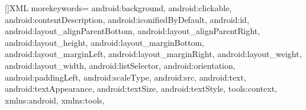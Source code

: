 
[]{XML} {
	morekeywords={
		android:background,
		android:clickable,
		android:contentDescription,
		android:iconifiedByDefault,
		android:id,
		android:layout_alignParentBottom,
		android:layout_alignParentRight,
		android:layout_height,
		android:layout_marginBottom,
		android:layout_marginLeft,
		android:layout_marginRight,
		android:layout_weight,
		android:layout_width,
		android:listSelector,
		android:orientation,
		android:paddingLeft,
		android:scaleType,
		android:src,
		android:text,
		android:textAppearance,
		android:textSize,
	 	android:textStyle,
		tools:context,
		xmlns:android,
		xmlns:tools,
	}     
}

